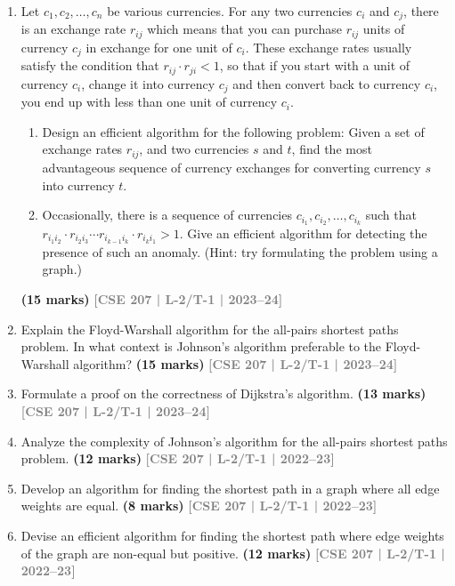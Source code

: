 \documentclass[12pt,a3paper]{article}
\newcommand{\yr}[1]{\hfill\textcolor{gray}{\small\textbf{[#1]}}}
\newcommand{\mk}[1]{\textcolor{orange!70!black}{\small\textbf{(#1 marks)}}}
\begin{document}
\begin{enumerate}
\item Let $c_1, c_2, \dots, c_n$ be various currencies. For any two currencies $c_i$ and $c_j$, there is an 
exchange rate $r_{ij}$ which means that you can purchase $r_{ij}$ units of currency $c_j$ in 
exchange for one unit of $c_i$. These exchange rates usually satisfy the condition that 
$r_{ij} \cdot r_{ji} < 1$, so that if you start with a unit of currency $c_i$, change it into currency $c_j$ and 
then convert back to currency $c_i$, you end up with less than one unit of currency $c_i$.
\begin{enumerate}
  \item Design an efficient algorithm for the following problem: Given a set of exchange rates $r_{ij}$, and two currencies $s$ and $t$, find the most advantageous sequence of currency exchanges for converting currency $s$ into currency $t$.
  \item Occasionally, there is a sequence of currencies $c_{i_1}, c_{i_2}, \ldots, c_{i_k}$ such that $r_{i_1 i_2} \cdot r_{i_2 i_3} \cdots r_{i_{k-1} i_k} \cdot r_{i_k i_1} > 1$. Give an efficient algorithm for detecting the presence of such an anomaly. (Hint: try formulating the problem using a graph.)
\end{enumerate}
\mk{15} \yr{CSE 207 | L-2/T-1 | 2023--24}

\item Explain the Floyd-Warshall algorithm for the all-pairs shortest paths problem. In what context is Johnson's algorithm preferable to the Floyd-Warshall algorithm?
\mk{15} \yr{CSE 207 | L-2/T-1 | 2023--24}

\item Formulate a proof on the correctness of Dijkstra's algorithm.
\mk{13} \yr{CSE 207 | L-2/T-1 | 2023--24}

\item Analyze the complexity of Johnson's algorithm for the all-pairs shortest paths problem.
\mk{12} \yr{CSE 207 | L-2/T-1 | 2022--23}

\item Develop an algorithm for finding the shortest path in a graph where all edge weights are equal.
\mk{8} \yr{CSE 207 | L-2/T-1 | 2022--23}

\item Devise an efficient algorithm for finding the shortest path where edge weights of the graph are non-equal but positive.
\mk{12} \yr{CSE 207 | L-2/T-1 | 2022--23}


\end{enumerate}
\end{document}
